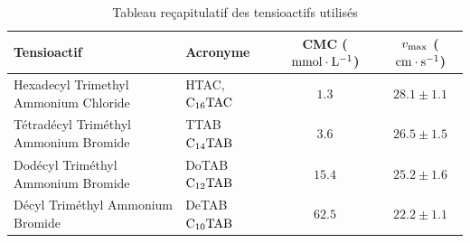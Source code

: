 \documentclass[french, 10pt]{article}
\begin{document}
% 
% 

\begin{table}[!ht]
  \centering
  \begin{tabular}{llcc}
    \hline \hline
    Tensioactif & Acronyme & CMC ($\rm mmol\cdot L^{-1}$) & $v_{\rm max}$ ($\rm cm\cdot s^{-1}$)\\ \hline \hline
    Hexadecyl Trimethyl Ammonium Chloride &HTAC, $\rm C_{16}TAC$& $1.3$ & $28.1\pm 1.1$ \\
    Tétradécyl Triméthyl Ammonium Bromide &TTAB $\rm C_{14}TAB$ & $3.6$ & $26.5\pm 1.5$\\
    Dodécyl Triméthyl Ammonium Bromide &DoTAB $\rm C_{12}TAB$ & $15.4$ &  $25.2 \pm 1.6$ \\
    Décyl Triméthyl Ammonium Bromide & DeTAB $\rm C_{10}TAB$ & $62.5$ & $22.2\pm 1.1$\\ \hline \hline 
  \end{tabular}
  \caption{Tableau reçapitulatif des tensioactifs utilisés}
  \label{Table:Tablev0}
\end{table}
 
\end{document}
